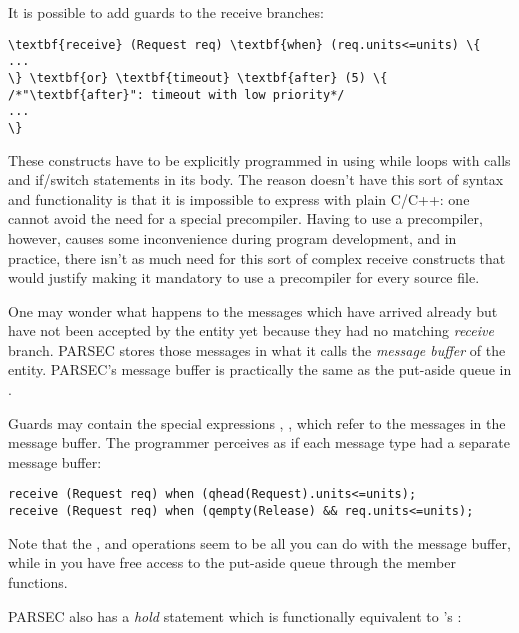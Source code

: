 It is possible to add guards to the receive branches:

\begin{Verbatim}[commandchars=\\\{\}]
\textbf{receive} (Request req) \textbf{when} (req.units<=units) \{
...
\} \textbf{or} \textbf{timeout} \textbf{after} (5) \{ /*"\textbf{after}": timeout with low priority*/
...
\}
\end{Verbatim}


These constructs have to be explicitly programmed in {\opp}
using while loops with  calls and if/switch statements
in its body. The reason {\opp} doesn't have this sort of syntax
and functionality is that it is impossible to express with plain
C/C++: one cannot avoid the need for a special precompiler. Having
to use a precompiler, however, causes some inconvenience during
program development, and in practice, there isn't as much need
for this sort of complex receive constructs that would justify
making it mandatory to use a precompiler for every source file.


One may wonder what happens to the messages which have arrived
already but have not been accepted by the entity yet because
they had no matching \textit{receive} branch. PARSEC stores those
messages in what it calls the \textit{message buffer} of the entity.
PARSEC's message buffer is practically the same as the put-aside
queue in {\opp}.

\begin{sloppypar}
Guards may contain the special expressions
,
,
 which refer to the
messages in the message buffer. The programmer perceives as if each
message type had a separate message buffer:
\end{sloppypar}

\begin{verbatim}
receive (Request req) when (qhead(Request).units<=units);
receive (Request req) when (qempty(Release) && req.units<=units);
\end{verbatim}


Note that the ,  and 
operations seem to be all you can do with the message buffer, while in
{\opp} you have free access to the put-aside queue through the
 member functions.

PARSEC also has a \textit{hold} statement which is functionally equivalent
to {\opp}'s :

